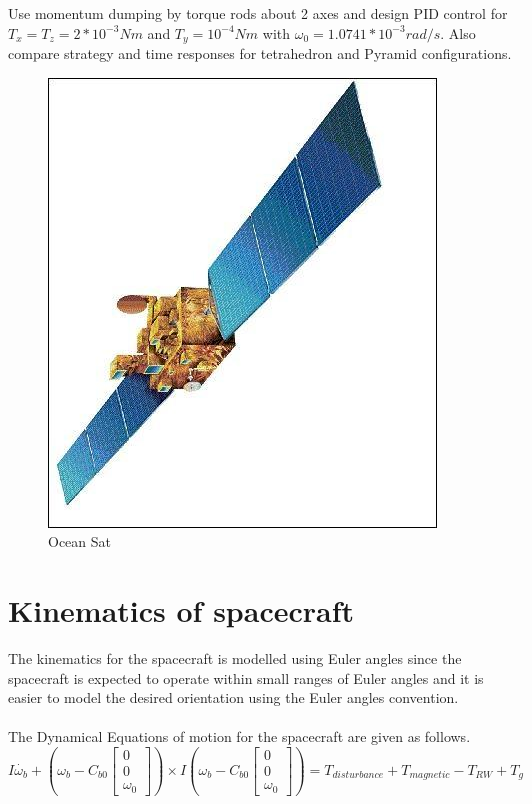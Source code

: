 \documentclass[10pt,a4paper]{report}
\begin{document}
Use momentum dumping by torque rods about 2 axes and design PID control for $ T_{x}= T_{z}=2*10^{-3}Nm $ and $ T_{y}=10^{-4}Nm $ with $ \omega_{0}= 1.0741*10^{-3} rad/s $.
Also compare strategy and time responses for tetrahedron and Pyramid configurations.
\\\begin{figure}[H]
\centering
\includegraphics[scale=0.5]{image_gallery.png}
\caption{Ocean Sat}
\end{figure}
\chapter{Kinematics of spacecraft}
The kinematics for the spacecraft is modelled using Euler angles since the spacecraft is expected to operate within small ranges of Euler angles and it is easier to model the desired orientation using the Euler angles convention.
\\ \\
The Dynamical Equations of motion for the spacecraft are given as follows.\\
\begin{equation}
I\dot{\omega_{b}}+\left(\omega_{b}-C_{b0}\begin{bmatrix}
0\\0\\\omega_{0}
\end{bmatrix}\right)\times I\left(\omega_{b}-C_{b0}\begin{bmatrix}
0\\0\\\omega_{0}
\end{bmatrix}\right)=T_{disturbance}+T_{magnetic}-T_{RW}+T_{g}
\end{equation}
\end{document}
